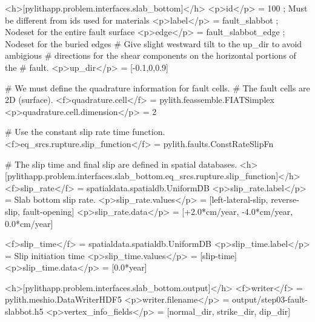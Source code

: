 
\begin{cfg}
<h>[pylithapp.problem.interfaces.slab_bottom]</h>
<p>id</p> = 100 ; Must be different from ids used for materials
<p>label</p> = fault_slabbot ; Nodeset for the entire fault surface
<p>edge</p> = fault_slabbot_edge ; Nodeset for the buried edges
# Give slight westward tilt to the up_dir to avoid ambigious
# directions for the shear components on the horizontal portions of the
# fault.
<p>up_dir</p> = [-0.1,0,0.9]

# We must define the quadrature information for fault cells.
# The fault cells are 2D (surface).
<f>quadrature.cell</f> = pylith.feassemble.FIATSimplex
<p>quadrature.cell.dimension</p> = 2

# Use the constant slip rate time function.
<f>eq_srcs.rupture.slip_function</f> = pylith.faults.ConstRateSlipFn

# The slip time and final slip are defined in spatial databases.
<h>[pylithapp.problem.interfaces.slab_bottom.eq_srcs.rupture.slip_function]</h>
<f>slip_rate</f> = spatialdata.spatialdb.UniformDB
<p>slip_rate.label</p> = Slab bottom slip rate.
<p>slip_rate.values</p> = [left-lateral-slip, reverse-slip, fault-opening]
<p>slip_rate.data</p> = [+2.0*cm/year, -4.0*cm/year, 0.0*cm/year]

<f>slip_time</f> = spatialdata.spatialdb.UniformDB
<p>slip_time.label</p>  = Slip initiation time
<p>slip_time.values</p> = [slip-time]
<p>slip_time.data</p> = [0.0*year] 

<h>[pylithapp.problem.interfaces.slab_bottom.output]</h>
<f>writer</f> = pylith.meshio.DataWriterHDF5
<p>writer.filename</p> = output/step03-fault-slabbot.h5
<p>vertex_info_fields</p> = [normal_dir, strike_dir, dip_dir]
\end{cfg}



